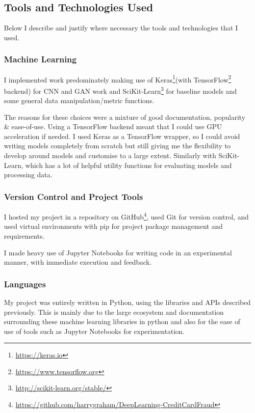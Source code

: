 \documentclass[12pt,a4paper,twoside]{report}
\begin{document}
\subsection{Tools and Technologies Used} \label{tools}

Below I describe and justify where necessary the tools and technologies that I used.

\subsubsection{Machine Learning}

I implemented work predominately making use of Keras\footnote{\href{https://keras.io}{https://keras.io}}(with TensorFlow\footnote{\href{https://www.tensorflow.org}{https://www.tensorflow.org}} backend) for CNN and GAN work and SciKit-Learn\footnote{\href{ http://scikit-learn.org/stable/}{ http://scikit-learn.org/stable/}} for baseline models and some general data manipulation/metric functions. 

The reasons for these choices were a mixture of good documentation, popularity \& ease-of-use. Using a TensorFlow backend meant that I could use GPU acceleration if needed. I used Keras as a TensorFlow wrapper, so I could avoid writing models completely from scratch but still giving me the flexibility to develop around models and customise to a large extent. Similarly with SciKit-Learn, which has a lot of helpful utility functions for evaluating models and processing data.

\subsubsection{Version Control and Project Tools}

I hosted my project in a repository on GitHub\footnote{\href{https://github.com/harrygraham/DeepLearning-CreditCardFraud}{https://github.com/harrygraham/DeepLearning-CreditCardFraud}}, used Git for version control, and used virtual environments with pip for project package management and requirements.

I made heavy use of Jupyter Notebooks for writing code in an experimental manner, with immediate execution and feedback. 


\subsubsection{Languages}

My project was entirely written in Python, using the libraries and APIs described previously. This is mainly due to the large ecosystem and documentation surrounding these machine learning libraries in python and also for the ease of use of tools such as Jupyter Notebooks for experimentation.
\end{document}
